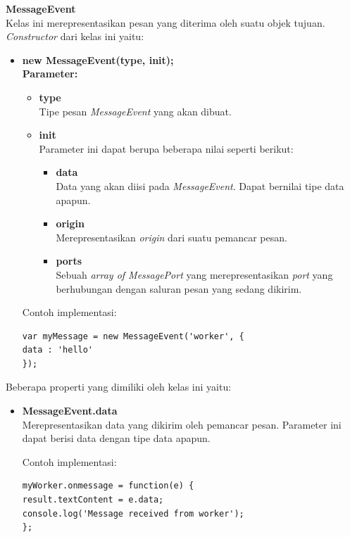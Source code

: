 \documentclass[a4paper,twoside]{article}
\begin{document}
\begin{enumerate}
\begin{enumerate}
			
			\textbf{MessageEvent} \\
			Kelas ini merepresentasikan pesan yang diterima oleh suatu objek tujuan. \textit{Constructor} dari kelas ini yaitu: 
			\begin{itemize}
				\item \textbf{new MessageEvent(type, init);} \\
				\textbf{Parameter:}
				\begin{itemize}
					\item \textbf{type} \\ Tipe pesan \textit{MessageEvent} yang akan dibuat.
					\item \textbf{init} \\ Parameter ini dapat berupa beberapa nilai seperti berikut:
					\begin{itemize}
						\item \textbf{data} \\ Data yang akan diisi pada \textit{MessageEvent}. Dapat bernilai tipe data apapun.
						\item \textbf{origin} \\ Merepresentasikan \textit{origin} dari suatu pemancar pesan.
						\item \textbf{ports} \\ Sebuah \textit{array of MessagePort} yang merepresentasikan \textit{port} yang berhubungan dengan saluran pesan yang sedang dikirim.
					\end{itemize}
				\end{itemize}
				Contoh implementasi:
\begin{lstlisting}
var myMessage = new MessageEvent('worker', {
data : 'hello'
});
				\end{lstlisting}
			\end{itemize}
			
			Beberapa properti yang dimiliki oleh kelas ini yaitu: 
			
			\begin{itemize}
				\item \textbf{MessageEvent.data} \\ Merepresentasikan data yang dikirim oleh pemancar pesan. Parameter ini dapat berisi data dengan tipe data apapun. 
				
				Contoh implementasi:
\begin{lstlisting}
myWorker.onmessage = function(e) {
result.textContent = e.data;
console.log('Message received from worker');
};
\end{lstlisting}
				

\end{itemize}
\end{enumerate}
\end{enumerate}
\end{document}
